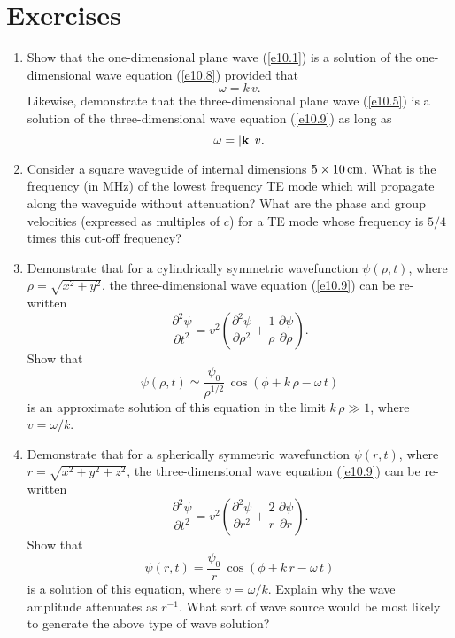 \section{Exercises}
{\small \begin{enumerate}
\item Show that the one-dimensional plane wave (\ref{e10.1}) is a solution of the one-dimensional wave equation (\ref{e10.8})
provided that 
$$
\omega=k\,v.
$$
Likewise, demonstrate that the three-dimensional plane wave (\ref{e10.5}) is a solution of the three-dimensional wave
equation (\ref{e10.9}) as long as
$$
\omega = |{\bf k}|\,v.
$$

\item Consider a square waveguide of internal dimensions $5\times 10\,{\rm cm}$. What is the frequency
(in MHz) of the lowest frequency TE mode which will propagate along the waveguide without attenuation?
What are the phase and group velocities (expressed as multiples of $c$) for a TE mode whose
frequency is $5/4$ times this cut-off frequency?

\item Demonstrate that for a cylindrically symmetric wavefunction $\psi(\rho,t)$, where $\rho= \sqrt{x^2+y^2}$, the 
three-dimensional wave equation (\ref{e10.9}) 
can be re-written 
$$
\frac{\partial^2\psi}{\partial t^2} = v^2\left(\frac{\partial^2\psi}{\partial \rho^2} + \frac{1}{\rho}\,\frac{\partial\psi}{\partial\rho}\right).
$$
Show that 
$$
\psi(\rho,t) \simeq \frac{\psi_0}{\rho^{1/2}}\,\cos(\phi+k\,\rho-\omega\,t)
$$
is an approximate solution of this equation in  the limit $k\,\rho\gg 1$, where $v=\omega/k$. 

\item Demonstrate that for a spherically symmetric wavefunction $\psi(r,t)$, where $r=\sqrt{x^2+y^2+z^2}$, the 
three-dimensional wave equation (\ref{e10.9}) 
can be re-written 
$$
\frac{\partial^2\psi}{\partial t^2} = v^2\left(\frac{\partial^2\psi}{\partial r^2} + \frac{2}{r}\,\frac{\partial\psi}{\partial r}\right).
$$
Show that
$$
\psi(r,t) =\frac{ \psi_0}{r}\,\cos(\phi+k\,r-\omega\,t)
$$
is a solution of this equation, where $v=\omega/k$. Explain why the wave amplitude attenuates as $r^{-1}$. What sort of wave source would be most likely to
generate the above type of wave solution?
\end{enumerate}}
